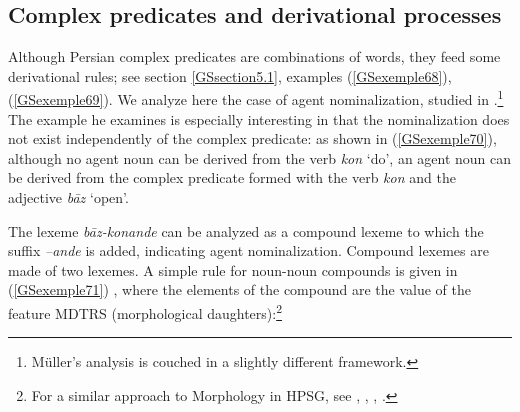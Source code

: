 \documentclass[output=paper]{langsci/langscibook}
\begin{document}
{\subsection{Complex predicates and derivational processes}\label{GSsection5.2}

Although Persian complex predicates are combinations of words, they feed some derivational rules; see section \ref{GSsection5.1}, examples (\ref{GSexemple68}), (\ref{GSexemple69}). We analyze here the case of agent nominalization, studied in \cite{muller2010persian}.\footnote{Müller’s analysis is couched in a slightly different framework.} The example he examines is especially interesting in that the nominalization does not exist independently of the complex predicate: as shown in (\ref{GSexemple70}), although no agent noun can be derived from the verb \textit{kon} `do', an agent noun can be derived from the complex predicate formed with the verb \textit{kon} and the adjective \textit{b\=az} `open'.


\begin{exe}
\end{exe}

The lexeme \textit{b\=az-konande} can be analyzed as a compound lexeme to which the suffix \textit{–ande} is added, indicating agent nominalization. Compound lexemes are made of two lexemes. A simple rule for noun-noun compounds is given in (\ref{GSexemple71}) \citep{bonami2018lexeme}, where the elements of the compound are the value of the feature MDTRS (morphological daughters):\footnote{For a similar approach to Morphology in HPSG, see \cite{orgun1996sign}, \cite{riehemann1998type}, \cite{koenig1999lexical}, \cite{sag2003syntactic}.}

\begin{exe}
\end{exe}

}
\end{document}
